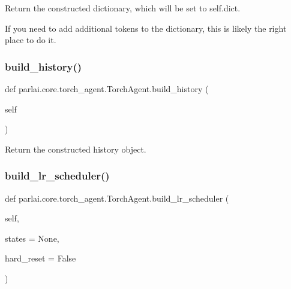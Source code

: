 \begin{DoxyVerb}Return the constructed dictionary, which will be set to self.dict.

If you need to add additional tokens to the dictionary, this is likely the right
place to do it.
\end{DoxyVerb}
 \mbox{\label{classparlai_1_1core_1_1torch__agent_1_1TorchAgent_ab22f61f153b522f429210c61eed2d5af}} 
\subsubsection{\texorpdfstring{build\+\_\+history()}{build\_history()}}
{\footnotesize\ttfamily def parlai.\+core.\+torch\+\_\+agent.\+Torch\+Agent.\+build\+\_\+history (\begin{DoxyParamCaption}\item[{}]{self }\end{DoxyParamCaption})}

\begin{DoxyVerb}Return the constructed history object.
\end{DoxyVerb}
 \mbox{\label{classparlai_1_1core_1_1torch__agent_1_1TorchAgent_aa51ac42dc34e3d2281a01cba78a96151}} 
\subsubsection{\texorpdfstring{build\+\_\+lr\+\_\+scheduler()}{build\_lr\_scheduler()}}
{\footnotesize\ttfamily def parlai.\+core.\+torch\+\_\+agent.\+Torch\+Agent.\+build\+\_\+lr\+\_\+scheduler (\begin{DoxyParamCaption}\item[{}]{self,  }\item[{}]{states = {\ttfamily None},  }\item[{}]{hard\+\_\+reset = {\ttfamily False} }\end{DoxyParamCaption})}


